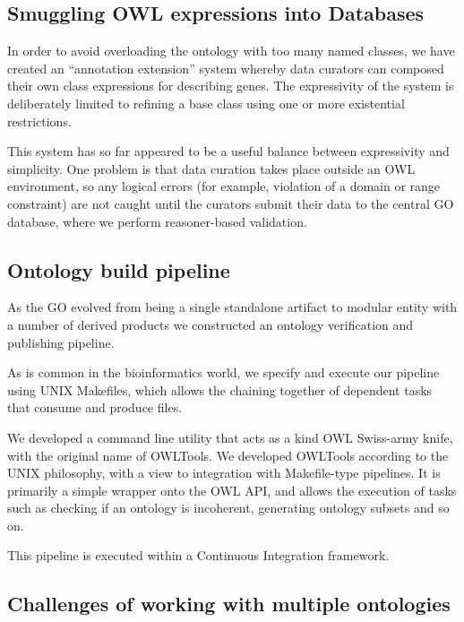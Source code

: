 \documentclass{llncs}
\begin{document}
\subsection{Smuggling OWL expressions into Databases}

In order to avoid overloading the ontology with too many named
classes, we have created an ``annotation extension'' system whereby
data curators can composed their own class expressions for describing
genes\cite{Huntley2014}. The expressivity of the system is
deliberately limited to refining a base class using one or more
existential restrictions.

This system has so far appeared to be a useful balance between
expressivity and simplicity. One problem is that data curation takes
place outside an OWL environment, so any logical errors (for example,
violation of a domain or range constraint) are not caught until the
curators submit their data to the central GO database, where we
perform reasoner-based validation.


\subsection{Ontology build pipeline}

As the GO evolved from being a single standalone artifact to modular
entity with a number of derived products we constructed an ontology
verification and publishing pipeline.

As is common in the bioinformatics world, we specify and execute our
pipeline using UNIX Makefiles, which allows the chaining together of
dependent tasks that consume and produce files.

We developed a command line utility that acts as a kind OWL Swiss-army
knife, with the original name of OWLTools. We developed
OWLTools according to the UNIX philosophy, with a view to integration
with Makefile-type pipelines. It is primarily a simple wrapper onto
the OWL API, and allows the execution of tasks such as checking if an
ontology is incoherent, generating ontology subsets and so on.

This pipeline is executed within a Continuous Integration
framework\cite{Mungall2012a}.

\subsection{Challenges of working with multiple ontologies}
\end{document}
